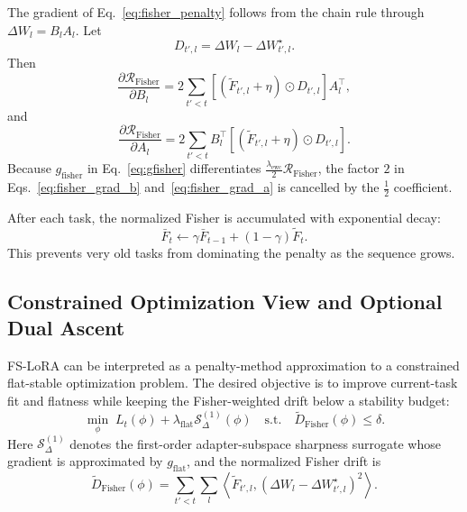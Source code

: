 The gradient of Eq.~\eqref{eq:fisher_penalty} follows from the chain rule through $\Delta W_l=B_lA_l$.
Let
\begin{equation}
D_{t',l}
=
\Delta W_l
-
\Delta W_{t',l}^{\star}.
\label{eq:fisher_drift}
\end{equation}
Then
\begin{equation}
\frac{
\partial
\mathcal R_{\mathrm{Fisher}}
}{
\partial B_l
}
=
2
\sum_{t'<t}
\left[
\left(
\widetilde F_{t',l}+\eta
\right)
\odot
D_{t',l}
\right]
A_l^\top,
\label{eq:fisher_grad_b}
\end{equation}
and
\begin{equation}
\frac{
\partial
\mathcal R_{\mathrm{Fisher}}
}{
\partial A_l
}
=
2
\sum_{t'<t}
B_l^\top
\left[
\left(
\widetilde F_{t',l}+\eta
\right)
\odot
D_{t',l}
\right].
\label{eq:fisher_grad_a}
\end{equation}
Because $g_{\mathrm{fisher}}$ in Eq.~\eqref{eq:gfisher} differentiates $\frac{\lambda_{\mathrm{ewc}}}{2}\mathcal R_{\mathrm{Fisher}}$, the factor $2$ in Eqs.~\eqref{eq:fisher_grad_b} and~\eqref{eq:fisher_grad_a} is cancelled by the $\frac{1}{2}$ coefficient.

After each task, the normalized Fisher is accumulated with exponential decay:
\begin{equation}
\bar F_t
\leftarrow
\gamma \bar F_{t-1}
+
(1-\gamma)\widetilde F_t.
\label{eq:fisher_accum}
\end{equation}
This prevents very old tasks from dominating the penalty as the sequence grows.

\subsection{Constrained Optimization View and Optional Dual Ascent}
\label{sec:dual_ascent}

FS-LoRA can be interpreted as a penalty-method approximation to a constrained flat-stable optimization problem.
The desired objective is to improve current-task fit and flatness while keeping the Fisher-weighted drift below a stability budget:
\begin{equation}
\min_{\phi}
\;
L_t(\phi)
+
\lambda_{\mathrm{flat}}
\mathcal S_{\Delta}^{(1)}(\phi)
\quad
\mathrm{s.t.}
\quad
\widetilde D_{\mathrm{Fisher}}(\phi)
\leq
\delta.
\label{eq:constrained_fs}
\end{equation}
Here $\mathcal S_{\Delta}^{(1)}$ denotes the first-order adapter-subspace sharpness surrogate whose gradient is approximated by $g_{\mathrm{flat}}$, and the normalized Fisher drift is
\begin{equation}
\widetilde D_{\mathrm{Fisher}}(\phi)
=
\sum_{t'<t}
\sum_l
\left\langle
\widetilde F_{t',l},
\left(
\Delta W_l-\Delta W_{t',l}^{\star}
\right)^2
\right\rangle.
\label{eq:fisher_drift_budget}
\end{equation}

